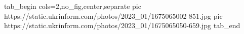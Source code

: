  
 
 
 
 

\ifcmt
  tab_begin cols=2,no_fig,center,separate
     pic https://static.ukrinform.com/photos/2023_01/1675065002-851.jpg
     pic https://static.ukrinform.com/photos/2023_01/1675065050-659.jpg
  tab_end
\fi
